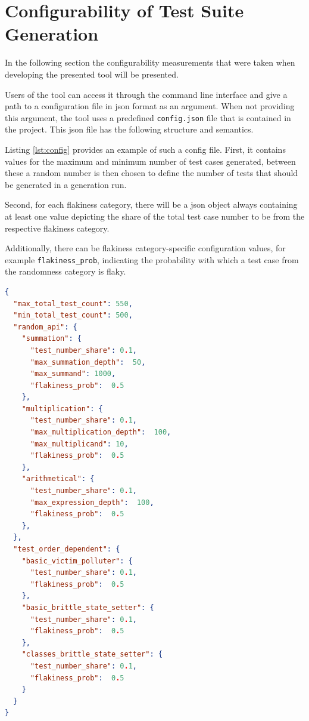 \documentclass[
fancyheadings, %
%
%
]{stsreprt}
\begin{document}
\section{Configurability of Test Suite Generation}
In the following section the configurability measurements that were taken when developing the presented tool will be presented. \par
Users of the tool can access it through the command line interface and give a path to a configuration file in \acrlong{json} format as an argument. 
When not providing this argument, the tool uses a predefined \lstinline{config.json} file that is contained in the project.
This \acrshort{json} file has the following structure and semantics. \par 
Listing \ref{lst:config} provides an example of such a config file.
First, it contains values for the maximum and minimum number of test cases generated, between these a random number is then chosen to define the number of tests that should be generated in a generation run. \par
Second, for each flakiness category, there will be a \acrshort{json} object always containing at least one value depicting the share of the total test case number to be from the respective flakiness category. \par
Additionally, there can be flakiness category-specific configuration values, for example \lstinline{flakiness_prob}, indicating the probability with which a test case from the randomness category is flaky.  

\begin{lstlisting}[language=json,firstnumber=1, caption={Examplary \lstinline{config.json} file}, label=lst:config]
{
  "max_total_test_count": 550,
  "min_total_test_count": 500,
  "random_api": {
    "summation": {
      "test_number_share": 0.1,
      "max_summation_depth":  50,
      "max_summand": 1000,
      "flakiness_prob":  0.5
    },
    "multiplication": {
      "test_number_share": 0.1,
      "max_multiplication_depth":  100,
      "max_multiplicand": 10,
      "flakiness_prob":  0.5
    },
    "arithmetical": {
      "test_number_share": 0.1,
      "max_expression_depth":  100,
      "flakiness_prob":  0.5
    },
  },
  "test_order_dependent": {
    "basic_victim_polluter": {
      "test_number_share": 0.1,
      "flakiness_prob":  0.5
    },
    "basic_brittle_state_setter": {
      "test_number_share": 0.1,
      "flakiness_prob":  0.5
    },
    "classes_brittle_state_setter": {
      "test_number_share": 0.1,
      "flakiness_prob":  0.5
    }
  }
}
\end{lstlisting}
\end{document}
